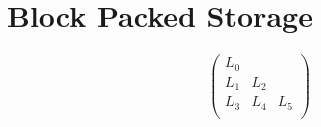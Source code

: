 \section{Block Packed Storage}\label{sec: memory layout}

\[
	\begin{pmatrix}
		L_0 & \\
		L_1 & L_2 \\
		L_3 & L_4 & L_5 \\
	\end{pmatrix}
\]

